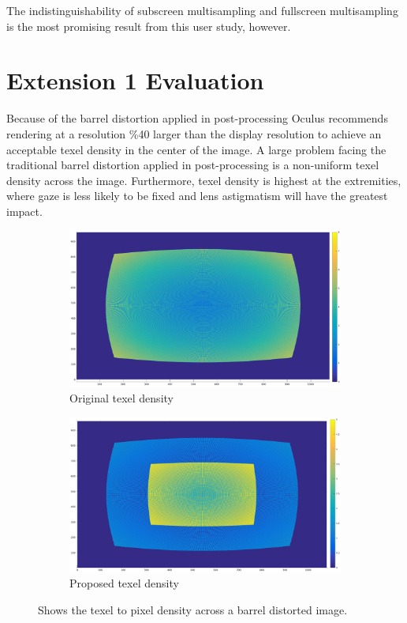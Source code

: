 \documentclass[12pt,a4paper,twoside,openright]{report}
\begin{document}
The indistinguishability of subscreen multisampling and fullscreen multisampling is the most promising result from this user study, however.

\clearpage

\section{Extension 1 Evaluation}

Because of the barrel distortion applied in post-processing Oculus recommends rendering at a resolution \%40 larger than the display resolution to achieve an acceptable texel density in the center of the image.
A large problem facing the traditional barrel distortion applied in post-processing is a non-uniform texel density across the image. Furthermore, texel density is highest at the extremities, where gaze is less likely to be fixed and lens astigmatism will have the greatest impact. 

\begin{figure}[tbh]

\begin{subfigure}{0.5\textwidth}
\includegraphics[width=1.2\linewidth]{figs/oculus_pixel_density.eps}
\caption{Original texel density}
\label{epsfig1}
\end{subfigure}
\begin{subfigure}{0.5\textwidth}
\includegraphics[width=1.2\linewidth]{figs/oculus_pixel_density_optimisation.eps}
\caption{Proposed texel density}
\label{epsfig1}
\end{subfigure}
 
\caption{Shows the texel to pixel density across a barrel distorted image.}
\label{fig:barreldensity}
\end{figure}
\end{document}
